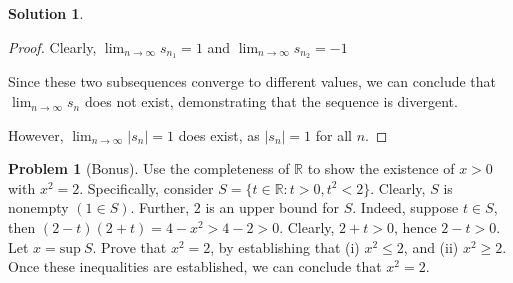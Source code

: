 \documentclass[12pt]{article}
\theoremstyle{definition} %
\newtheorem{solution}{Solution}
\newtheorem{problem}{Problem}
\theoremstyle{plain} %
\begin{document}
\begin{solution}
\begin{proof}
Clearly, $\lim_{n \to \infty} s_{n_1} = 1$ and $\lim_{n \to \infty} s_{n_2} = -1$

Since these two subsequences converge to different values, we can conclude that $\lim_{n \to \infty} s_n$ does not exist, demonstrating that the sequence is divergent.

However, $\lim_{n \to \infty} |s_n| = 1$ does exist, as $|s_n| = 1$ for all $n$.

   \end{proof} 
\end{solution}

\begin{problem}[Bonus]
    Use the completeness of $\mathbb{R}$ to show the existence of $x>0$ with $x^2=2$. Specifically, consider $S=\{t\in \mathbb{R} : t>0, t^2<2\}$. Clearly, $S$ is nonempty $(1\in S)$. Further, $2$ is an upper bound for $S$. Indeed, suppose $t\in S$, then $(2-t)(2+t)=4-x^2>4-2>0$. Clearly, $2+t>0$, hence $2-t>0$. 
Let $x=\text{sup} \ S$. Prove that $x^2=2$, by establishing that (i) $x^2\leq 2$, and (ii) $x^2\geq 2$. Once these inequalities are established, we can conclude that $x^2=2$.

\end{problem}
\end{document}
